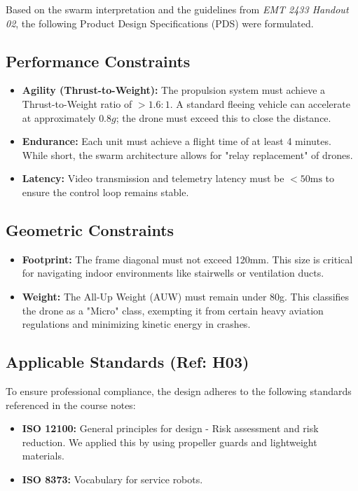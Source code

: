 \documentclass[12pt, a4paper]{article}
\begin{document}
Based on the swarm interpretation and the guidelines from \textit{EMT 2433 Handout 02}, the following Product Design Specifications (PDS) were formulated.

\subsection{Performance Constraints}
\begin{itemize}
    \item \textbf{Agility (Thrust-to-Weight):} The propulsion system must achieve a Thrust-to-Weight ratio of $>1.6:1$. A standard fleeing vehicle can accelerate at approximately $0.8g$; the drone must exceed this to close the distance.
    \item \textbf{Endurance:} Each unit must achieve a flight time of at least 4 minutes. While short, the swarm architecture allows for "relay replacement" of drones.
    \item \textbf{Latency:} Video transmission and telemetry latency must be $<50\text{ms}$ to ensure the control loop remains stable.
\end{itemize}

\subsection{Geometric Constraints}
\begin{itemize}
    \item \textbf{Footprint:} The frame diagonal must not exceed 120mm. This size is critical for navigating indoor environments like stairwells or ventilation ducts.
    \item \textbf{Weight:} The All-Up Weight (AUW) must remain under 80g. This classifies the drone as a "Micro" class, exempting it from certain heavy aviation regulations and minimizing kinetic energy in crashes.
\end{itemize}

\subsection{Applicable Standards (Ref: H03)}
To ensure professional compliance, the design adheres to the following standards referenced in the course notes:
\begin{itemize}
    \item \textbf{ISO 12100:} General principles for design - Risk assessment and risk reduction. We applied this by using propeller guards and lightweight materials.
    \item \textbf{ISO 8373:} Vocabulary for service robots.
\end{itemize}
\end{document}
